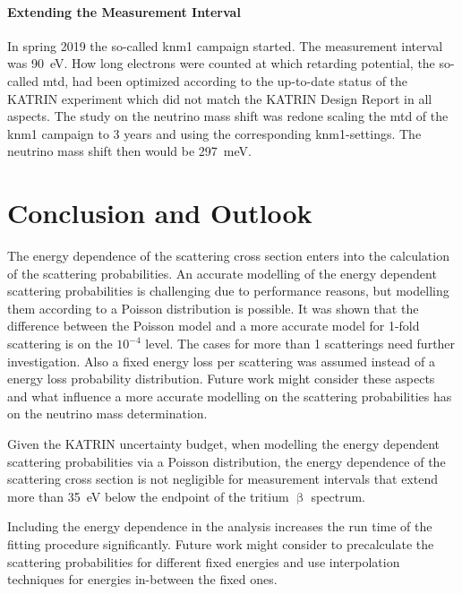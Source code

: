 \paragraph{Extending the Measurement Interval}
In spring 2019 the so-called \gls{knm1} campaign started. The measurement interval was \SI{90}{eV}. How long electrons were counted at which retarding potential, the so-called \gls{mtd}, had been optimized according to the up-to-date status of the KATRIN experiment which did not match the KATRIN Design Report in all aspects. The study on the neutrino mass shift was redone scaling the \gls{mtd} of the \gls{knm1} campaign to 3 years and using the corresponding \gls{knm1}-settings. The neutrino mass shift then would be \SI{297}{meV}.


\section{Conclusion and Outlook}
The energy dependence of the scattering cross section enters into the calculation of the scattering probabilities. An accurate modelling of the energy dependent scattering probabilities is challenging due to performance reasons, but modelling them according to a Poisson distribution is possible. It was shown that the difference between the Poisson model and a more accurate model for 1-fold scattering is on the $10^{-4}$ level. The cases for more than 1 scatterings need further investigation. Also a fixed energy loss per scattering was assumed instead of a energy loss probability distribution. Future work might consider these aspects and what influence a more accurate modelling on the scattering probabilities has on the neutrino mass determination.

Given the KATRIN uncertainty budget, when modelling the energy dependent scattering probabilities via a Poisson distribution, the energy dependence of the scattering cross section is not negligible for measurement intervals that extend more than \SI{35}{eV} below the endpoint of the tritium $\upbeta$ spectrum.

Including the energy dependence in the analysis increases the run time of the fitting procedure significantly. Future work might consider to precalculate the scattering probabilities for different fixed energies and use interpolation techniques for energies in-between the fixed ones.